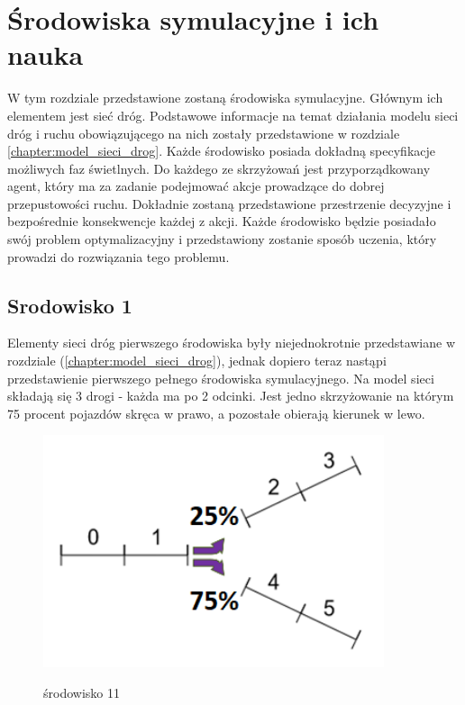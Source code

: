 \documentclass[12pt]{book}
\theoremstyle{plain}
\newcommand{\myref}[1]{(\ref{#1})}
\begin{document}
\chapter {Środowiska symulacyjne i ich nauka}
W tym rozdziale przedstawione zostaną środowiska symulacyjne. Głównym ich elementem jest sieć dróg. Podstawowe informacje na temat działania modelu sieci dróg i ruchu obowiązującego na nich zostały przedstawione w rozdziale \ref{chapter:model_sieci_drog}. Każde środowisko posiada dokładną specyfikacje możliwych faz świetlnych. Do każdego ze skrzyżowań jest przyporządkowany agent, który ma za zadanie podejmować akcje prowadzące do dobrej przepustowości ruchu. Dokładnie zostaną przedstawione przestrzenie decyzyjne i bezpośrednie konsekwencje każdej z akcji. Każde środowisko będzie posiadało swój problem optymalizacyjny i przedstawiony zostanie sposób uczenia, który prowadzi do rozwiązania tego problemu. 
\section{Srodowisko 1}
Elementy sieci dróg pierwszego środowiska były niejednokrotnie przedstawiane w rozdziale \myref{chapter:model_sieci_drog}, jednak dopiero teraz nastąpi przedstawienie pierwszego pełnego środowiska symulacyjnego. Na model sieci składają się 3 drogi - każda ma po 2 odcinki. Jest jedno skrzyżowanie na którym 75 procent pojazdów skręca w prawo, a pozostałe obierają kierunek w lewo.
\begin{figure}[H]
	\centering
	\includegraphics[width=10cm]{images/env_11_procenty}
	\label{fig:env_11}
	\caption{środowisko 11}
\end{figure}
\end{document}
